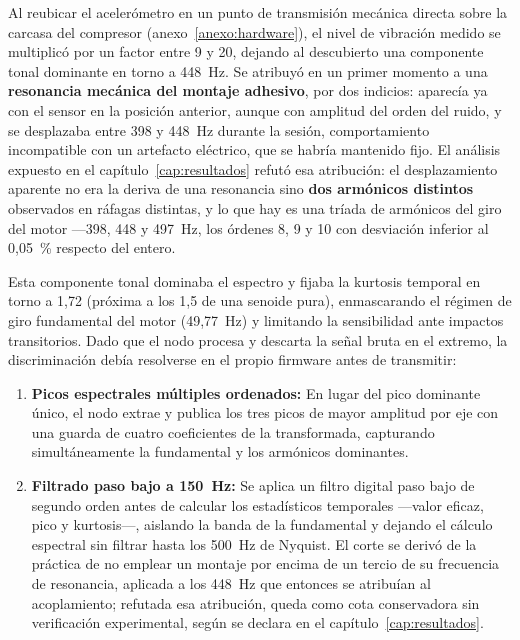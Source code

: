 Al reubicar el acelerómetro en un punto de transmisión mecánica directa sobre la carcasa del
compresor (anexo~\ref{anexo:hardware}), el nivel de vibración medido se multiplicó por un factor
entre 9 y 20, dejando al descubierto una componente tonal dominante en torno a \mbox{448 Hz}. Se
atribuyó en un primer momento a una \textbf{resonancia mecánica del montaje adhesivo}, por dos
indicios: aparecía ya con el sensor en la posición anterior, aunque con amplitud del orden del
ruido, y se desplazaba entre \mbox{398} y \mbox{448 Hz} durante la sesión, comportamiento
incompatible con un artefacto eléctrico, que se habría mantenido fijo. El análisis expuesto en el
capítulo~\ref{cap:resultados} refutó esa atribución: el desplazamiento aparente no era la deriva de
una resonancia sino \textbf{dos armónicos distintos} observados en ráfagas distintas, y lo que hay
es una tríada de armónicos del giro del motor —\mbox{398}, \mbox{448} y \mbox{497 Hz}, los órdenes
8, 9 y 10 con desviación inferior al 0,05~\% respecto del entero.

Esta componente tonal dominaba el espectro y fijaba la kurtosis temporal en torno a 1,72 (próxima a
los 1,5 de una senoide pura), enmascarando el régimen de giro fundamental del motor (\mbox{49,77 Hz})
y limitando la sensibilidad ante impactos transitorios. Dado que el nodo procesa y descarta la señal
bruta en el extremo, la discriminación debía resolverse en el propio firmware antes de transmitir:

\begin{enumerate}
    \item \textbf{Picos espectrales múltiples ordenados:} En lugar del pico dominante único, el nodo
        extrae y publica los tres picos de mayor amplitud por eje con una guarda de cuatro
        coeficientes de la transformada, capturando simultáneamente la fundamental y los armónicos dominantes.
    \item \textbf{Filtrado paso bajo a \mbox{150 Hz}:} Se aplica un filtro digital paso bajo de
        segundo orden antes de calcular los estadísticos temporales —valor eficaz, pico y kurtosis—, aislando
        la banda de la fundamental y dejando el cálculo espectral sin filtrar hasta los \mbox{500 Hz}
de Nyquist. El corte se derivó de la práctica de no emplear un montaje por encima de un
        tercio de su frecuencia de resonancia, aplicada a los \mbox{448 Hz} que entonces se
        atribuían al acoplamiento; refutada esa atribución, queda como cota conservadora sin
        verificación experimental, según se declara en el capítulo~\ref{cap:resultados}.
\end{enumerate}

